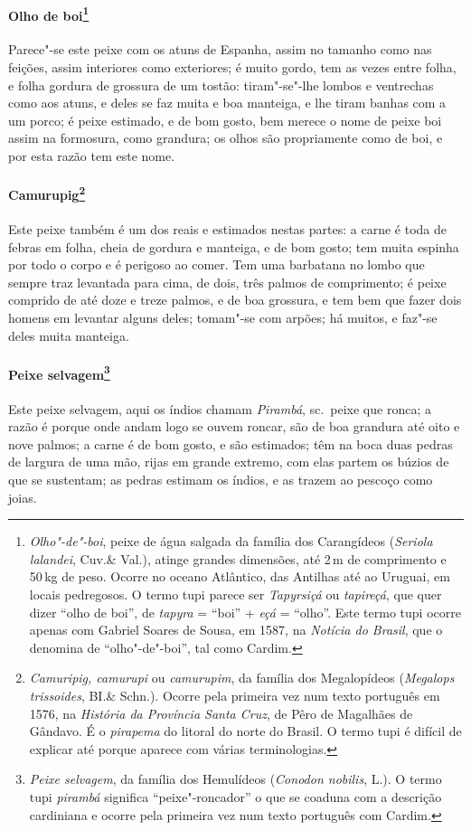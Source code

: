 \paragraph{Olho de boi\footnote{ \textit{Olho"-de"-boi}, peixe de água
salgada da família dos Carangídeos (\textit{Seriola lalandei}, Cuv.\&
Val.), atinge grandes dimensões, até 2\,m de comprimento e 50\,kg de peso.
Ocorre no oceano Atlântico, das Antilhas até ao Uruguai, em locais
pedregosos. O termo tupi parece ser \textit{Tapyrsiçá} ou
\textit{tapireçá}, que quer dizer ``olho de boi'', de \textit{tapyra} = 
``boi'' + \textit{eçá} = ``olho''. Este termo tupi ocorre apenas com
Gabriel Soares de Sousa, em 1587, na \textit{Notícia do Brasil}, que o
denomina de ``olho"-de"-boi'', tal como Cardim.}} 
Parece"-se este peixe com os atuns de Espanha, assim no tamanho como
nas feições, assim interiores como exteriores; é muito gordo, tem as
vezes entre folha, e folha gordura de grossura de um tostão:
tiram"-se"-lhe lombos e ventrechas como aos atuns, e deles se faz muita e
boa manteiga, e lhe tiram banhas com a um porco; é peixe estimado, e de
bom gosto, bem merece o nome de peixe boi assim na formosura, como
grandura; os olhos são propriamente como de boi, e por esta razão tem este nome.

\paragraph{Camurupig\footnote{ \textit{Camuripig, camurupi} ou
\textit{camurupim}, da família dos Megalopídeos (\textit{Megalops
trissoides}, BI.\& Schn.). Ocorre pela primeira vez num texto português
em 1576, na \textit{História da Província Santa Cruz}, de Pêro de
Magalhães de Gândavo. É o \textit{pirapema} do litoral do norte do Brasil.
O termo tupi é difícil de explicar até porque aparece com várias
terminologias.}} Este peixe também é um dos reais e
estimados nestas partes: a carne é toda de febras em folha, cheia de
gordura e manteiga, e de bom gosto; tem muita espinha por todo o corpo
e é perigoso ao comer. Tem uma barbatana no lombo que sempre traz
levantada para cima, de dois, três palmos de comprimento; é peixe
comprido de até doze e treze palmos, e de boa grossura, e tem bem que
fazer dois homens em levantar alguns deles; tomam"-se com arpões; há
muitos, e faz"-se deles muita manteiga.

\paragraph{Peixe selvagem\footnote{ \textit{Peixe selvagem}, da família
dos Hemulídeos (\textit{Conodon nobilis}, L.). O termo tupi
\textit{pirambá} significa ``peixe"-roncador'' o que se coaduna com a
descrição cardiniana e ocorre pela primeira vez num texto português com
Cardim.}} Este peixe selvagem, aqui os índios chamam
\textit{Pirambá}, sc.~peixe que ronca; a razão é porque onde andam
logo se ouvem roncar, são de boa grandura até oito e nove palmos; a 
carne é de bom gosto, e são estimados; têm na boca duas pedras de
largura de uma mão, rijas em grande extremo, com elas partem os búzios
de que se sustentam; as pedras estimam os índios, e as trazem ao
pescoço como joias.

